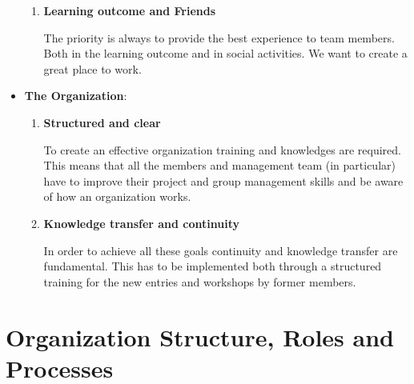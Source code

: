 \documentclass[graybox]{svmult}
\begin{document}
\begin{itemize}
\begin{enumerate}
        \item \textbf{Learning outcome and Friends}
        
        The priority is always to provide the best experience to team members. Both in the learning outcome and in social activities. We want to create a great place to work.
    \end{enumerate}
    \item \textbf{The Organization}:
    \begin{enumerate}
        \item \textbf{Structured and clear}
        
        To create an effective organization training and knowledges are required. This means that all the members and management team (in particular) have to improve their project and group management skills and be aware of how an organization works.
    
        \item \textbf{Knowledge transfer and continuity}
    
        In order to achieve all these goals continuity and knowledge transfer are fundamental. This has to be implemented both through a structured training for the new entries and workshops by former members.
    \end{enumerate}
\end{itemize}

\section{Organization Structure, Roles and Processes}
\label{sec:2}
\end{document}
